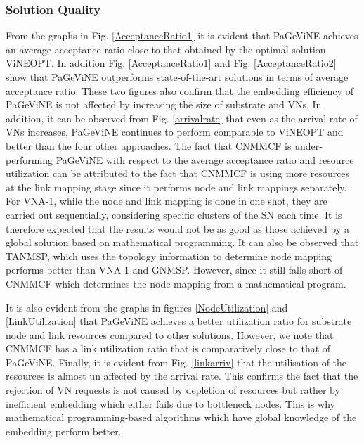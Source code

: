 \documentclass[journal]{IEEEtran}
\begin{document}
\subsubsection{Solution Quality}
From the graphs in Fig. \ref{AcceptanceRatio1} it is evident that PaGeViNE achieves an average acceptance ratio close to that obtained by the optimal solution ViNEOPT. In addition Fig. \ref{AcceptanceRatio1} and Fig. \ref{AcceptanceRatio2} show that PaGeViNE outperforms state-of-the-art solutions in terms of average acceptance ratio. These two figures also confirm that the embedding efficiency of PaGeViNE is not affected by increasing the size of substrate and \acp{VN}. In addition, it can be observed from Fig. \ref{arrivalrate} that even as the arrival rate of VNs increases, PaGeViNE continues to perform comparable to ViNEOPT and better than the four other approaches. The fact that CNMMCF is under-performing PaGeViNE with respect to the average acceptance ratio and resource utilization can be attributed to the fact that CNMMCF is using more resources at the link mapping stage since it performs node and link mappings separately. For VNA-1, while the node and link mapping is done in one shot, they are carried out sequentially, considering specific clusters of the \ac{SN} each time. It is therefore expected that the results would not be as good as those achieved by a global solution based on mathematical programming. It can also be observed that TANMSP, which uses the topology information to determine node mapping performs better than VNA-1 and GNMSP. However, since it still falls short of CNMMCF which determines the node mapping from a mathematical program.

It is also evident from the graphs in figures \ref{NodeUtilization} and \ref{LinkUtilization} that PaGeViNE achieves a better utilization ratio for substrate node and link resources compared to other solutions. However, we note that CNMMCF has a link utilization ratio that is comparatively close to that of PaGeViNE. Finally, it is evident from Fig. \ref{linkarriv} that the utilisation of the resources is almost un affected by the arrival rate. This confirms the fact that the rejection of VN requests is not caused by depletion of resources but rather by inefficient embedding which either fails due to bottleneck nodes. This is why mathematical programming-based algorithms which have global knowledge of the embedding perform better.
\end{document}
